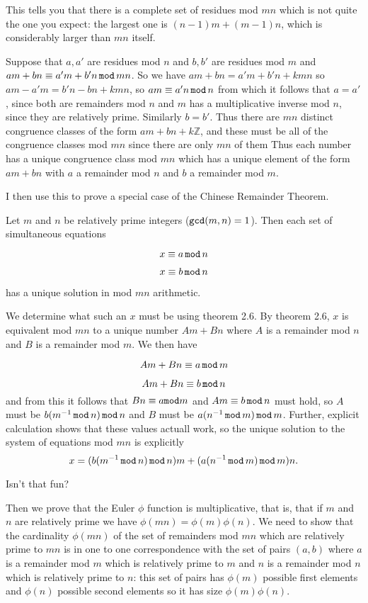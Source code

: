 \documentclass[12pt]{article}
\begin{document}
This tells you that there is a complete set of residues mod $mn$ which is not quite the one you expect:  the largest one is $(n-1)m + (m-1)n$, which is considerably larger
than $mn$ itself.

Suppose that $a,a'$ are residues mod $n$ and $b,b'$ are residues mod $m$ and $am+ bn \equiv a'm+b'n \,{\tt mod}\,mn$.  So we have $am+bn = a'm+b'n+kmn$ so
$am - a'm = b'n-bn+kmn$, so $am \equiv a'n \,{\tt mod}\, n$ from which it follows that $a=a'$, since both are remainders mod $n$ and $m$ has a multiplicative inverse mod $n$, since they are relatively prime.  Similarly $b=b'$.  Thus there are $mn$ distinct congruence classes of the form $am+bn + k{\mathbb Z}$, and these must be all of the congruence classes mod $mn$ since there are only $mn$ of them  Thus each number has a unique congruence class mod $mn$ which has a unique element of the form $am +bn$ with $a$ a remainder mod $n$ and $b$ a remainder mod $m$.

I then use this to prove a special case of the Chinese Remainder Theorem.

Let $m$ and $n$ be relatively prime integers (${\tt gcd}(m,n) =1$).  Then each set of simultaneous equations

$$x \equiv a \,{\tt mod}\,n$$

$$x \equiv b \,{\tt mod}\,n$$

has a unique solution in mod $mn$ arithmetic.

We determine what such an $x$ must be using theorem 2.6.  By theorem 2.6, $x$ is equivalent mod $mn$ to a unique number $Am+Bn$ where $A$ is a remainder mod $n$ and $B$ is a remainder mod $m$.  We then have 

$$Am+Bn \equiv a \,{\tt mod}\,m$$

$$Am+Bn  \equiv b \,{\tt mod}\,n$$
and from this it follows that $Bn \equiv a {\tt mod} m$ and $Am \equiv b\,{\tt mod}\,n$ must hold, so $A$ must be $b(m^{-1}\,{\tt mod}\,n)\,{\tt mod}\, n$ and $B$ must be
$a(n^{-1} \,{\tt mod}\, m)\,{\tt mod} \,m$.  Further, explicit calculation shows that these values actuall work, so the unique solution to the system of equations mod $mn$ is
explicitly $$x = (b(m^{-1}\,{\tt mod}\,n)\,{\tt mod}\, n)m + (a(n^{-1} \,{\tt mod}\, m)\,{\tt mod} \,m)n.$$

Isn't that fun?

Then we prove that the Euler $\phi$ function is multiplicative, that is, that if $m$ and $n$ are relatively prime we have $\phi(mn) = \phi(m)\phi(n)$.  We need to show that the cardinality $\phi(mn)$ of the set of remainders mod $mn$ which are relatively prime to $mn$
is in one to one correspondence with the set of pairs $(a,b)$ where $a$ is a remainder mod $m$ which is relatively prime to $m$ and $n$ is a remainder mod $n$ which is relatively prime to $n$:  this set of pairs has $\phi(m)$ possible first elements and $\phi(n)$ possible second elements so it has size $\phi(m)\phi(n)$.
\end{document}
